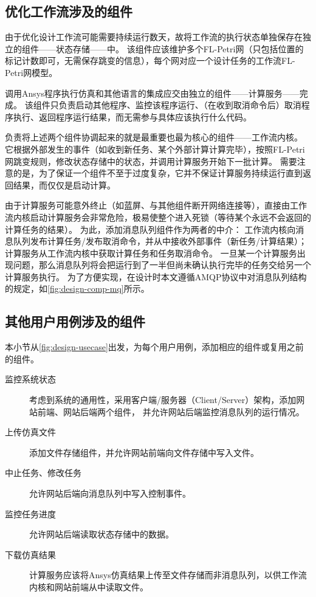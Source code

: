 \documentclass[index]{subfiles}
\begin{document}
\subsection{优化工作流涉及的组件}\label{ssec:design-wf}
由于优化设计工作流可能需要持续运行数天，故将工作流的执行状态单独保存在独立的组件——状态存储——中。
该组件应该维护多个FL-Petri网（只包括位置的标记计数即可，无需保存跳变的信息），每个网对应一个设计任务的工作流FL-Petri网模型。

调用Ansys程序执行仿真和其他语言的集成应交由独立的组件——计算服务——完成。
该组件只负责启动其他程序、监控该程序运行、（在收到取消命令后）取消程序执行、返回程序运行结果，而无需参与具体应该执行什么代码。

负责将上述两个组件协调起来的就是最重要也最为核心的组件——工作流内核。
它根据外部发生的事件（如收到新任务、某个外部计算计算完毕），按照FL-Petri网跳变规则，修改状态存储中的状态，并调用计算服务开始下一批计算。
需要注意的是，为了保证一个组件不至于过度复杂，它并不保证计算服务持续运行直到返回结果，而仅仅是启动计算。

由于计算服务可能意外终止（如蓝屏、与其他组件断开网络连接等），直接由工作流内核启动计算服务会非常危险，极易使整个进入死锁（等待某个永远不会返回的计算任务的结果）。
为此，添加消息队列组件作为两者的中介：
工作流内核向消息队列发布计算任务/发布取消命令，并从中接收外部事件（新任务/计算结果）；
计算服务从工作流内核中获取计算任务和任务取消命令。
一旦某一个计算服务出现问题，那么消息队列将会把运行到了一半但尚未确认执行完毕的任务交给另一个计算服务执行。
为了方便实现，在设计时本文遵循AMQP协议中对消息队列结构的规定，如\cref{fig:design-comp-mq}所示。

\subsection{其他用户用例涉及的组件}
本小节从\cref{fig:design-usecase}出发，为每个用户用例，添加相应的组件或复用之前的组件。
\begin{description}
  \item[监控系统状态] 考虑到系统的通用性，采用客户端/服务器（Client/Server）架构，添加网站前端、网站后端两个组件，
    并允许网站后端监控消息队列的运行情况。
  \item[上传仿真文件] 添加文件存储组件，并允许网站前端向文件存储中写入文件。
  \item[中止任务、修改任务] 允许网站后端向消息队列中写入控制事件。
  \item[监控任务进度] 允许网站后端读取状态存储中的数据。
  \item[下载仿真结果] 计算服务应该将Ansys仿真结果上传至文件存储而非消息队列，以供工作流内核和网站前端从中读取文件。
\end{description}
\end{document}
